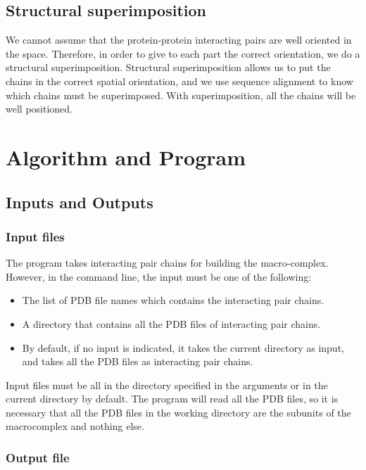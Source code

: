 \documentclass[a4paper,10pt]{report}
\begin{document}
\section{Structural superimposition}



We cannot assume that the protein-protein interacting pairs are well oriented in the space. Therefore, in order to give to each part the correct orientation, we do a structural superimposition. Structural superimposition allows us to put the chains in the correct spatial orientation, and we use sequence alignment to know which chains must be superimposed. With superimposition, all the chains will be well positioned. 



\chapter{Algorithm and Program}


\section{Inputs and Outputs}

\subsection{Input files}

The program takes interacting pair chains for building the macro-complex. However, in the command line, the input must be one of the following:

\begin{itemize}
 \item The list of PDB file names which contains the interacting pair chains.
 \item A directory that contains all the PDB files of interacting pair chains.
 \item By default, if no input is indicated, it takes the current directory as input, and takes all the PDB files as interacting pair chains.
\end{itemize}

\noindent
Input files must be all in the directory specified in the arguments or in the current directory by default. The program will read all the PDB files, so it is necessary that all the PDB files in the working directory are the subunits of the macrocomplex and nothing else.

\subsection{Output file}
\end{document}
